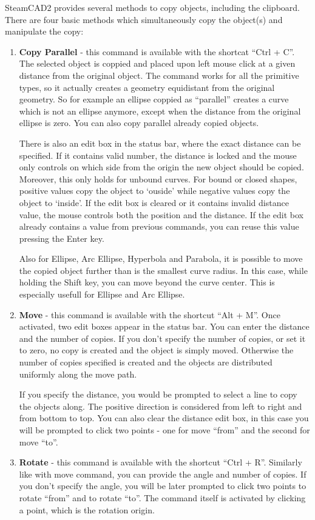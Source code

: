 SteamCAD2 provides several methods to copy objects, including the clipboard. There
are four basic methods which simultaneously copy the object(s) and manipulate the copy:
\begin{enumerate}
\item \textbf{Copy Parallel}\label{sec:copypar} - this command is available with the shortcat
``Ctrl + C''. The selected object is coppied and placed upon left mouse click at a given
distance from the original object. The command works for all the primitive types, so it
actually creates a geometry equidistant from the original geometry. So for example an ellipse
coppied as ``parallel'' creates a curve which is not an ellipse anymore, except when
the distance from the original ellipse is zero. You can also copy parallel already copied
objects.

There is also an edit box in the status bar, where the exact distance can be specified.
If it contains valid number, the distance is locked and the mouse only controls on which
side from the origin the new object should be copied. Moreover, this only holds for
unbound curves. For bound or closed shapes, positive values copy the object to `ouside'
while negative values copy the object to `inside'. If the edit box is cleared or it
contains invalid distance value, the mouse controls both the position and the distance.
If the edit box already contains a value from previous commands, you can reuse this value
pressing the Enter key.

Also for Ellipse, Arc Ellipse, Hyperbola and Parabola, it is possible to move the copied
object further than is the smallest curve radius. In this case, while holding the Shift
key, you can move beyond the curve center. This is especially usefull for Ellipse and
Arc Ellipse.
\item \textbf{Move} - this command is available with the shortcut ``Alt + M''. Once activated,
two edit boxes appear in the status bar. You can enter the distance and the number of copies.
If you don't specify the number of copies, or set it to zero, no copy is created and
the object is simply moved. Otherwise the number of copies specified is created and
the objects are distributed uniformly along the move path.

If you specify the distance, you would be prompted to select a line to copy the
objects along. The positive direction is considered from left to right and from bottom
to top. You can also clear the distance edit box, in this case you will be prompted
to click two points - one for move ``from'' and the second for move ``to''.
\item \textbf{Rotate} - this command is available with the shortcut ``Ctrl + R''.
Similarly like with move command, you can provide the angle and number of copies.
If you don't specify the angle, you will be later prompted to click two points to
rotate ``from'' and to rotate ``to''. The command itself is activated by clicking
a point, which is the rotation origin.


\end{enumerate}
